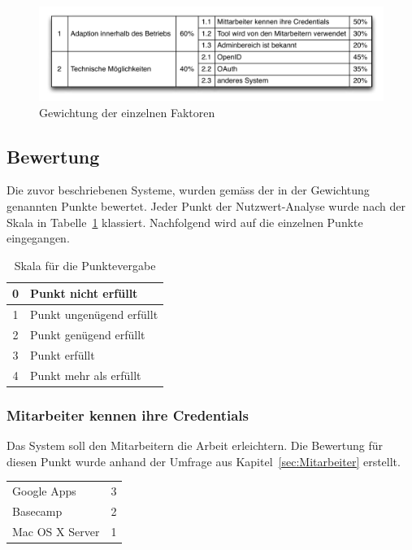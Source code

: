 \begin{figure}[H]
    \centering 
		\includegraphics[width=1\textwidth]{include/nutzwertanalyse1.pdf}
		\caption{Gewichtung der einzelnen Faktoren}
		\label{fig:nutzwertanalyse gewichtung}
\end{figure}

\subsection{Bewertung}
\label{sub:Bewertung}
Die zuvor beschriebenen Systeme, wurden gemäss der in der Gewichtung genannten Punkte bewertet. Jeder Punkt der Nutzwert-Analyse wurde nach der Skala in Tabelle~\ref{tab:nutzwertanalyse skala} klassiert. Nachfolgend wird auf die einzelnen Punkte eingegangen.

\begin{table}[h]
    \centering
        \begin{tabular}{|c|l|}
        \hline
        0 & Punkt nicht erfüllt\\
        \hline
        1 & Punkt ungenügend erfüllt\\
        \hline
        2 & Punkt genügend erfüllt\\
        \hline
        3 & Punkt erfüllt\\
        \hline
        4 & Punkt mehr als erfüllt\\
        \hline
        \end{tabular}
		\caption{Skala für die Punktevergabe}
		\label{tab:nutzwertanalyse skala}
\end{table}


\subsubsection{Mitarbeiter kennen ihre Credentials}
\label{ssub:Mitarbeiter kennen ihre Credentials}
Das System soll den Mitarbeitern die Arbeit erleichtern. Die Bewertung für diesen Punkt wurde anhand der Umfrage aus Kapitel~\ref{sec:Mitarbeiter} erstellt.

\begin{tabular}{lc}
Google Apps & 3\\
Basecamp & 2\\
Mac OS X Server & 1\\
\end{tabular}

